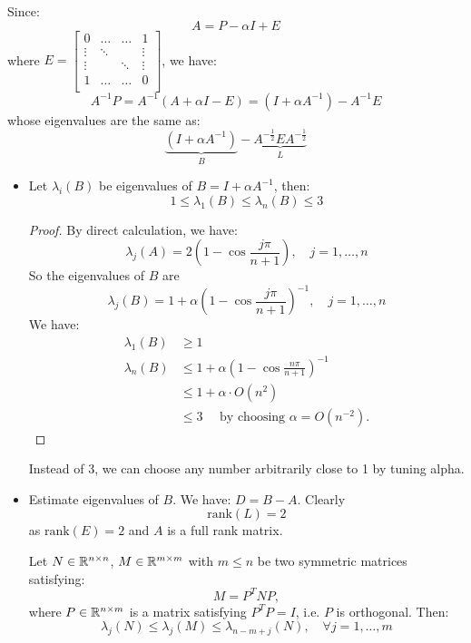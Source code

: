 \documentclass[../main/main.tex]{subfiles}
\begin{document}
Since: \[
A = P-\alpha  I + E
\] where $E = \begin{bmatrix}
0&\ldots &\ldots &1\\
\vdots&\ddots&&\vdots\\
\vdots&&\ddots&\vdots\\
1&\ldots &\ldots &0\\
\end{bmatrix}$, we have: \[
A^{-1}P = A^{-1}(A+\alpha I-E) =(I+\alpha A^{-1})-A^{-1} E
\]
whose eigenvalues are the same as: \[
  \underbrace{(I+\alpha A^{-1})}_{B}-\underbrace{A^{-\frac{1}{2}}E A^{-\frac{1}{2}}}_{L}
\]
\begin{itemize}
  \item Let $\lambda _{i}(B)$ be eigenvalues of $B = I + \alpha A^{-1}$, then: \[
        1\leq  \lambda _{1}(B)\leq  \lambda _{n}(B)\leq  3
        \]
        \begin{proof}
          By direct calculation, we have: \[
            \lambda _{j}(A)=2\left(1-\cos \frac{j\pi }{n+1} \right), \quad  j = 1 , \ldots  , n
          \]
          So the eigenvalues of $B$ are \[
            \lambda _{j}(B)=1+\alpha \left(1-\cos \frac{j\pi }{n+1} \right)^{-1}, \quad  j = 1 , \ldots  , n
          \]
  We have: \begin{align*}
\lambda _{1}(B)&\geq  1 \\
             \lambda _{n}(B)&\leq  1+\alpha \left(1-\cos \frac{n\pi }{n+1} \right)^{-1}\\
               &\leq  1+\alpha  \cdot  O(n^2)\\
             &\leq 3 \quad \text{ by choosing $\alpha =O(n^{-2})$}
             .\end{align*}
        \end{proof}
           \begin{remark}
             Instead of 3, we can choose any number arbitrarily close to 1 by tuning alpha.
\end{remark}
  \item Estimate eigenvalues of $B$. We have: $D = B-A$. Clearly \[
\text{rank}(L) = 2
        \] as $\text{rank}(E)=2$ and $A$ is a full rank matrix.
        \begin{theorem}
          Let $N \in \mathbb{R} ^{n \times  n}$, $M \in  \mathbb{R} ^{m \times  m}$ with $m \leq  n$ be two symmetric matrices satisfying: \[
M = P^{T} N P,
\] where $P\in \mathbb{R} ^{n\times  m}$ is a matrix satisfying $P^{T}P = I$, i.e. $P$ is orthogonal. Then: \[
  \lambda _{j} (N) \leq  \lambda _{j}(M) \leq \lambda _{n-m+j}(N), \quad \forall j = 1, \ldots  , m
\]
\end{theorem}
\end{itemize}
\end{document}
